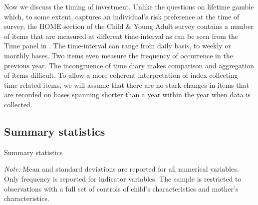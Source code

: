 \documentclass[emulatestandardclasses, 10pt, abstract = true]{scrartcl}
\begin{document}
Now we discuss the timing of investment. Unlike the questions on lifetime gamble which, to some extent, captures an individual's risk preference at the time of survey, the HOME section of the Child \& Young Adult survey contains a number of items that are measured at different time-interval as can be seen from the Time panel in . The time-interval can range from daily basis, to weekly or monthly bases. Two items even measure the frequency of occurrence in the previous year. The incongruence of time diary makes comparison and aggregation of items difficult. To allow a more coherent interpretation of index collecting time-related items, we will assume that there are no stark changes in items that are recorded on bases spanning shorter than a year within the year when data is collected.


\subsection{Summary statistics}

\begin{table}[!t]\centering \caption{Summary statistics \label{table:summary}}
	\setlength{\extrarowheight}{0.3em}
	\begin{threeparttable}
		
	\begin{tablenotes}[flushleft]\footnotesize
		\item \textit{Note:} Mean and standard deviations are reported for all numerical variables. Only frequency is reported for indicator variables. The sample is restricted to observations with a full set of controls of child's characteristics and mother's characteristics.
	\end{tablenotes}
	\end{threeparttable}
\end{table}
\end{document}
